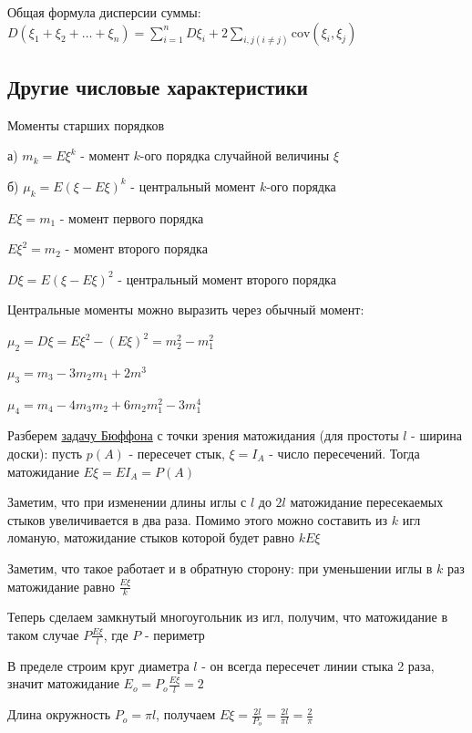 \documentclass[12pt]{article}
\begin{document}
     Общая формула дисперсии суммы: $D(\xi_1 + \xi_2 + \dots + \xi_n) = \sum_{i = 1}^n D \xi_i + 2\sum_{i, j (i \neq j)} \mathrm{cov} (\xi_i, \xi_j)$

    \subsection{Другие числовые характеристики}

    Моменты старших порядков

    а) $m_k = E\xi^k$ - момент $k$-ого порядка случайной величины $\xi$

    б) $\mu_k = E(\xi - E\xi)^k$ - центральный момент $k$-ого порядка

    $E\xi = m_1$ - момент первого порядка

    $E\xi^2 = m_2$ - момент второго порядка

    $D\xi = E(\xi - E\xi)^2$ - центральный момент второго порядка

    \Nota Центральные моменты можно выразить через обычный момент:

    $\mu_2 = D\xi = E\xi^2 - (E\xi)^2 = m_2^2 - m_1^2$

    $\mu_3 = m_3 - 3m_2 m_1 + 2m^3$

    $\mu_4 = m_4 - 4m_3 m_2 + 6m_2 m_1^2 - 3m_1^4$

    \Ex Разберем \hyperlink{buffonsproblem}{задачу Бюффона} с точки зрения матожидания (для простоты $l$ - ширина доски): пусть $p(A)$ - пересечет стык,
    $\xi = I_A$ - число пересечений. Тогда матожидание $E\xi = E I_A = P(A)$

    Заметим, что при изменении длины иглы с $l$ до $2l$ матожидание пересекаемых стыков увеличивается
    в два раза. Помимо этого можно составить из $k$ игл ломаную, матожидание стыков которой будет равно $kE\xi$

    Заметим, что такое работает и в обратную сторону: при уменьшении иглы в $k$ раз матожидание равно $\frac{E\xi}{k}$

    Теперь сделаем замкнутый многоугольник из игл, получим, что матожидание в таком случае $P\frac{E\xi}{l}$, где $P$ - периметр

    В пределе строим круг диаметра $l$ - он всегда пересечет линии стыка 2 раза, значит матожидание $E_o = P_o\frac{E\xi}{l} = 2$

    Длина окружность $P_o = \pi l$, получаем $E\xi = \frac{2l}{P_o} = \frac{2l}{\pi l} = \frac{2}{\pi}$

\end{document}
